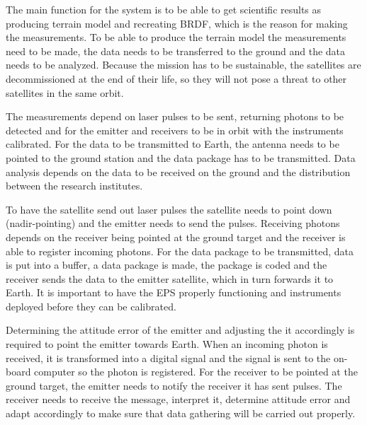 The main function for the system is to be able to get scientific results as producing terrain model and recreating \acs{BRDF}, which is the reason for making the measurements. To be able to produce the terrain model the measurements need to be made, the data needs to be transferred to the ground and the data needs to be analyzed. Because the mission has to be sustainable, the satellites are decommissioned at the end of their life, so they will not pose a threat to other satellites in the same orbit.

The measurements depend on laser pulses to be sent, returning photons to be detected and for the emitter and receivers to be in orbit with the instruments calibrated. For the data to be transmitted to Earth, the antenna needs to be pointed to the ground station and the data package has to be transmitted. Data analysis depends on the data to be received on the ground and the distribution between the research institutes.

To have the satellite send out laser pulses the satellite needs to point down (nadir-pointing) and the emitter needs to send the pulses. Receiving photons depends on the receiver being pointed at the ground target and the receiver is able to register incoming photons. For the data package to be transmitted, data is put into a buffer, a data package is made, the package is coded and the receiver sends the data to the emitter satellite, which in turn forwards it to Earth. It is important to have the \ac{EPS} properly functioning and instruments deployed before they can be calibrated.

Determining the attitude error of the emitter and adjusting the it accordingly is required to point the emitter towards Earth. When an incoming photon is received, it is transformed into a digital signal and the signal is sent to the on-board computer so the photon is registered. For the receiver to be pointed at the ground target, the emitter needs to notify the receiver it has sent pulses. The receiver needs to receive the message, interpret it, determine attitude error and adapt accordingly to make sure that data gathering will be carried out properly. 




